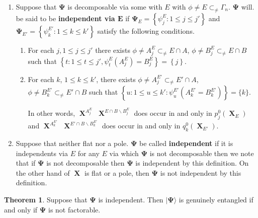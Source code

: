 \documentclass[a4paper,12pt]{article}
\DeclareMathOperator{\x}{\mathrm{X}}
\theoremstyle{definition}
\theoremstyle{underlinethm}
\newtheorem{thm}{Theorem}[section]
\theoremstyle{definition}
\begin{document}
\begin{enumerate}[label = (\roman*)]
 \item Suppose that $\boldsymbol{\Psi}$ is decomposable via some with $E$ with $\phi  \neq E \subset_{\neq} \Gamma_{n}$. $\boldsymbol{\Psi}$ will. be said to be \textbf{independent via $\boldsymbol{E}$} if $ \boldsymbol{\Psi}_{E} = \left\{\psi_{j}^{E} : 1 \leq j \leq j' \right\}$ and $\boldsymbol{\Psi}_{E'} = \left\{\psi_{k}^{E'} : 1 \leq k \leq k' \right\}$  satisfy the following conditions.
\begin{enumerate}[label = (\alph*)]
\item For each $j, 1 \leq j \leq j'$ there exists $\phi \neq A^{E}_{j} \subset_{\neq} E \cap A$, $\phi \neq B_{j}^{E} \subset_{\neq} E \cap B$ such that $\left\{t : 1 \leq t \leq j', \psi_{t}^{E} (A_{j}^{E}) = B_{j}^{E}\right\} = \left\{j\right\}$.

\item For each $k$, $1 \leq k \leq k'$, there exists $\phi \neq A_{j}^{E'} \subset_{\neq} E' \cap A$, $\phi\neq B_{k}^{E'} \subset_{\neq} E' \cap B $ such that $\left\{ u : 1 \leq u \leq k' : \psi_{u}^{E'} (A_{k}^{E'} = B_{k}^{E'})\right\} = \{k\}$.

In other words, $\boldsymbol{\x}^{A_{j}^{E}}$ $\boldsymbol{\x}^{E \cap B \smallsetminus B^{E}_{j}}$ does occur in and only in $p_{j}^{0} (\boldsymbol{\x}_{E})$ and $\boldsymbol{\x}^{A_{k}^{E'}}$ $\boldsymbol{\x}^{E' \cap B \smallsetminus B_{k}^{E'}}$ does occur in and only in $q_{k}^{0}(\boldsymbol{\x}_{E'})$.
\end{enumerate}

\item Suppose that neither flat nor a pole. $\boldsymbol{\Psi}$ be called \textbf{independent} if it is independents via $E$ for any $E$ via which $\boldsymbol{\Psi}$  is not decomposable then we note that if $\boldsymbol{\Psi}$ is not decomposable then $\boldsymbol{\Psi}$ is independent by this definition. On the other hand of $\boldsymbol{\x}$ is flat or a pole, then $\boldsymbol{\Psi}$ is not independent by this definition.

\end{enumerate}

\begin{thm}\label{thm-3.6}
Suppose that $\boldsymbol{\Psi}$ is independent. Then $| \boldsymbol{\Psi} \rangle$ is genuinely entangled if and only if $\boldsymbol{\Psi}$ is not factorable.
\end{thm}
\end{document}
